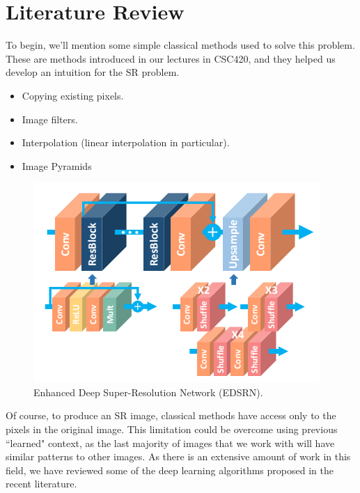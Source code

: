 \documentclass[letterpaper,12pt]{article}
\begin{document}
\pagebreak

\section*{Literature Review}

To begin, we'll mention some simple classical methods used to solve this problem. These are methods introduced in our lectures in CSC420, and they helped us develop an intuition for the SR problem.

\begin{itemize}
    \item Copying existing pixels.
    \item Image filters.
    \item Interpolation (linear interpolation in particular).
    \item Image Pyramids
\end{itemize}

\begin{figure}[h!]
    \centering
    \includegraphics[scale=.7]{opencv_/architecture.png}
    \caption{Enhanced Deep Super-Resolution Network (EDSRN). \cite{Lim2017}}
\end{figure}

Of course, to produce an SR image, classical methods have access only to the pixels in the original image. This limitation could be overcome using previous ``learned" context, as the last majority of images that we work with will have similar patterns to other images. As there is an extensive amount of work in this field, we have reviewed some of the deep learning algorithms proposed in the recent literature. 
\end{document}
